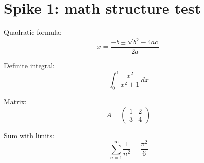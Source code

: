 \documentclass{article}
\begin{document}
\section*{Spike 1: math structure test}

Quadratic formula:
\[ x = \frac{-b \pm \sqrt{b^2 - 4ac}}{2a} \]

Definite integral:
\[ \int_0^1 \frac{x^2}{x^2 + 1}\, dx \]

Matrix:
\[ A = \begin{pmatrix} 1 & 2 \\ 3 & 4 \end{pmatrix} \]

Sum with limits:
\[ \sum_{n=1}^{\infty} \frac{1}{n^2} = \frac{\pi^2}{6} \]
\end{document}
